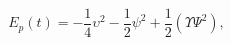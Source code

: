 \begin{equation}
\label{pp-of-Energy}
 E_{p}(t)=- \frac{1}{4}\upsilon^2
-\frac12 \psi^2+  \frac{1}{ 2}(\Upsilon \Psi^2 ),
\end{equation}

